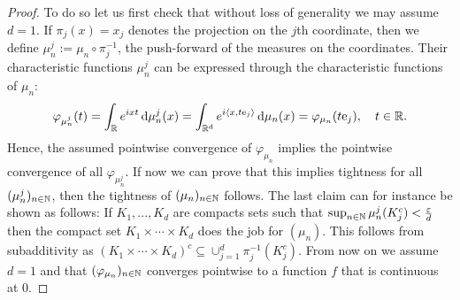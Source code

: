 \begin{proof}[Proof]
To do so let us first check that without loss of generality we may assume $d=1$. If $\pi_j(x)=x_j$ denotes the projection on the $j$th coordinate, then we define $\mu_n^j:= \mu_n\circ \pi^{-1}_j$, the push-forward of the measures on the coordinates. Their characteristic functions $\mu_n^j$ can be expressed through the characteristic functions of $\mu_n$:
\begin{align*}
	\varphi_{\mu_n^{j}}(t) = \int_{\mathbb{R}} e^{ixt} \, \mathrm{d} \mu_n^j(x)
		=  \int_{\mathbb{R}^d} e^{i \langle x , t  \text{e}_j \rangle} \, \mathrm{d} \mu_n(x)
		= \varphi_{\mu_n}(t  \text{e}_j),\quad t\in\mathbb{R}.
\end{align*}
Hence, the assumed pointwise convergence of $\varphi_{\mu_n}$ implies the pointwise convergence of all $\varphi_{\mu_n^j}$. If now we can prove that this implies tightness for all $(\mu_n^j)_{n\in\mathbb{N}}$, then the tightness of $(\mu_n)_{n\in\mathbb{N}}$ follows. The last claim can for instance be shown as follows: If $K_1,...,K_d$ are compacts sets such that $\sup_{n\in\mathbb{N}}\mu^j_n(K_j^c)<\frac{\varepsilon}{d}$ then the compact set $K_1\times \cdots \times K_d$ does the job for $(\mu_n)$. This follows from subadditivity as $(K_1\times \cdots \times K_d)^c\subseteq \cup_{j=1}^d\pi_j^{-1}(K_j^c)$. From now on we assume $d=1$ and that $(\varphi_{\mu_n})_{n\in\mathbb{N}}$ converges pointwise to a function $f$ that is continuous at $0$. 
				

\end{proof}
